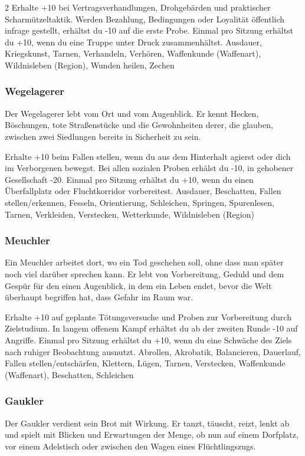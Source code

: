 {\begin{multicols*}{2}
        \wegespielwertebox
        {Erhalte +10 bei Vertragsverhandlungen, Drohgebärden und praktischer Scharmützeltaktik.}
        {Werden Bezahlung, Bedingungen oder Loyalität öffentlich infrage gestellt, erhältst du -10 auf die erste Probe.}
        {Einmal pro Sitzung erhältst du +10, wenn du eine Truppe unter Druck zusammenhältst.}
        {Ausdauer, Kriegskunst, Tarnen, Verhandeln, Verhören, Waffenkunde (Waffenart), Wildnisleben (Region), Wunden heilen, Zechen}

        \subsubsection*{Wegelagerer}
        Der Wegelagerer lebt vom Ort und vom Augenblick. Er kennt Hecken, Böschungen, tote Straßenstücke und die Gewohnheiten derer, die glauben, zwischen zwei Siedlungen bereits in Sicherheit zu sein.

        \wegespielwertebox
        {Erhalte +10 beim Fallen stellen, wenn du aus dem Hinterhalt agierst oder dich im Verborgenen bewegst.}
        {Bei allen sozialen Proben erhälst du -10, in gehobener Gesellschaft -20.}
        {Einmal pro Sitzung erhältst du +10, wenn du einen Überfallplatz oder Fluchtkorridor vorbereitest.}
        {Ausdauer, Beschatten, Fallen stellen/erkennen, Fesseln, Orientierung, Schleichen, Springen, Spurenlesen, Tarnen, Verkleiden, Verstecken, Wetterkunde, Wildnisleben (Region)}

        \subsubsection*{Meuchler}
        Ein Meuchler arbeitet dort, wo ein Tod geschehen soll, ohne dass man später noch viel darüber sprechen kann. Er lebt von Vorbereitung, Geduld und dem Gespür für den einen Augenblick, in dem ein Leben endet, bevor die Welt überhaupt begriffen hat, dass Gefahr im Raum war.

        \wegespielwertebox
        {Erhalte +10 auf geplante Tötungsversuche und Proben zur Vorbereitung durch Zielstudium.}
        {In langem offenem Kampf erhältst du ab der zweiten Runde -10 auf Angriffe.}
        {Einmal pro Sitzung erhältst du +10, wenn du eine Schwäche des Ziels nach ruhiger Beobachtung ausnutzt.}
        {Abrollen, Akrobatik, Balancieren, Dauerlauf, Fallen stellen/entschärfen, Klettern, Lügen, Tarnen, Verstecken, Waffenkunde (Waffenart), Beschatten, Schleichen}

        \subsubsection*{Gaukler}
        Der Gaukler verdient sein Brot mit Wirkung. Er tanzt, täuscht, reizt, lenkt ab und spielt mit Blicken und Erwartungen der Menge, ob nun auf einem Dorfplatz, vor einem Adelstisch oder zwischen den Wagen eines Flüchtlingszugs.


\end{multicols*}}
